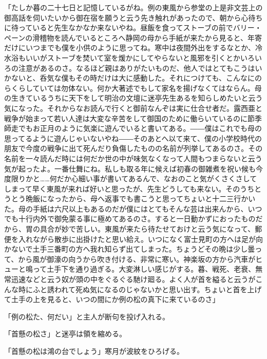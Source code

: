 \documentclass[12pt, openright]{book}
\begin{document}
「たしか暮の二十七日と記憶しているがね。例の東風から参堂の上是非文芸上の御高話を伺いたいから御在宿を願うと云う先き触れがあったので、朝から心待ちに待っていると先生なかなか来ないやね。昼飯を食ってストーブの前でバリー・ペーンの滑稽物を読んでいるところへ静岡の母から手紙が来たから見ると、年寄だけにいつまでも僕を小供のように思ってね。寒中は夜間外出をするなとか、冷水浴もいいがストーブを焚いて室を煖かにしてやらないと風邪を引くとかいろいろの注意があるのさ。なるほど親はありがたいものだ、他人ではとてもこうはいかないと、呑気な僕もその時だけは大に感動した。それにつけても、こんなにのらくらしていては勿体ない。何か大著述でもして家名を揚げなくてはならん。母の生きているうちに天下をして明治の文壇に迷亭先生あるを知らしめたいと云う気になった。それからなお読んで行くと御前なんぞは実に仕合せ者だ。露西亜と戦争が始まって若い人達は大変な辛苦をして御国のために働らいているのに節季師走でもお正月のように気楽に遊んでいると書いてある。――僕はこれでも母の思ってるように遊んじゃいないやね――そのあとへ以て来て、僕の小学校時代の朋友で今度の戦争に出て死んだり負傷したものの名前が列挙してあるのさ。その名前を一々読んだ時には何だか世の中が味気なくなって人間もつまらないと云う気が起ったよ。一番仕舞にね。私しも取る年に候えば初春の御雑煮を祝い候も今度限りかと\ldots{}\ldots{}何だか心細い事が書いてあるんで、なおのこと気がくさくさしてしまって早く東風が来れば好いと思ったが、先生どうしても来ない。そのうちとうとう晩飯になったから、母へ返事でも書こうと思ってちょいと十二三行かいた。母の手紙は六尺以上もあるのだが僕にはとてもそんな芸は出来んから、いつでも十行内外で御免蒙る事に極めてあるのさ。すると一日動かずにおったものだから、胃の具合が妙で苦しい。東風が来たら待たせておけと云う気になって、郵便を入れながら散歩に出掛けたと思い給え。いつになく富士見町の方へは足が向かないで土手三番町の方へ我れ知らず出てしまった。ちょうどその晩は少し曇って、から風が御濠の向うから吹き付ける、非常に寒い。神楽坂の方から汽車がヒューと鳴って土手下を通り過ぎる。大変淋しい感じがする。暮、戦死、老衰、無常迅速などと云う奴が頭の中をぐるぐる馳け廻る。よく人が首を縊ると云うがこんな時にふと誘われて死ぬ気になるのじゃないかと思い出す。ちょいと首を上げて土手の上を見ると、いつの間にか例の松の真下に来ているのさ」

「例の松た、何だい」と主人が断句を投げ入れる。

「首懸の松さ」と迷亭は領を縮める。

「首懸の松は鴻の台でしょう」寒月が波紋をひろげる。
\end{document}
